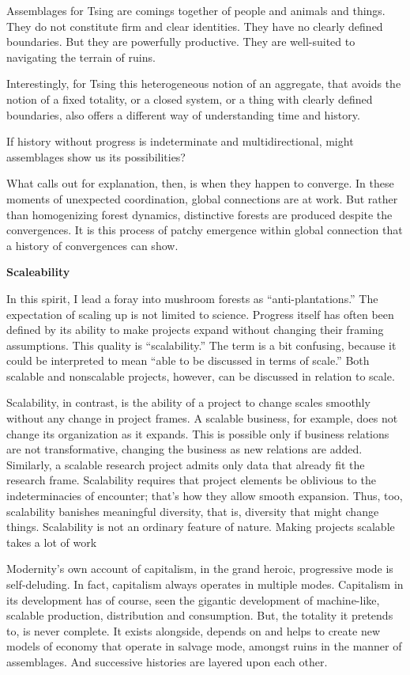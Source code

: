 \documentclass[
]{book}
\begin{document}
Assemblages for Tsing are comings together of people and animals and things. They do not constitute firm and clear identities. They have no clearly defined boundaries. But they are powerfully productive. They are well-suited to navigating the terrain of ruins.

Interestingly, for Tsing this heterogeneous notion of an aggregate, that avoids the notion of a fixed totality, or a closed system, or a thing with clearly defined boundaries, also offers a different way of understanding time and history.

If history without progress is indeterminate and multidirectional, might assemblages show us its possibilities?

What calls out for explanation, then, is when they happen to converge. In these moments of unexpected coordination, global connections are at work. But rather than homogenizing forest dynamics, distinctive forests are produced despite the convergences. It is this process of patchy emergence within global connection that a history of convergences can show.

\textbf{Scaleability}

In this spirit, I lead a foray into mushroom forests as ``anti-plantations.'' The expectation of scaling up is not limited to science. Progress itself has often been defined by its ability to make projects expand without changing their framing assumptions. This quality is ``scalability.'' The term is a bit confusing, because it could be interpreted to mean ``able to be discussed in terms of scale.'' Both scalable and nonscalable projects, however, can be discussed in relation to scale.

Scalability, in contrast, is the ability of a project to change scales smoothly without any change in project frames. A scalable business, for example, does not change its organization as it expands. This is possible only if business relations are not transformative, changing the business as new relations are added. Similarly, a scalable research project admits only data that already fit the research frame. Scalability requires that project elements be oblivious to the indeterminacies of encounter; that's how they allow smooth expansion. Thus, too, scalability banishes meaningful diversity, that is, diversity that might change things. Scalability is not an ordinary feature of nature. Making projects scalable takes a lot of work

Modernity's own account of capitalism, in the grand heroic, progressive mode is self-deluding. In fact, capitalism always operates in multiple modes. Capitalism in its development has of course, seen the gigantic development of machine-like, scalable production, distribution and consumption. But, the totality it pretends to, is never complete. It exists alongside, depends on and helps to create new models of economy that operate in salvage mode, amongst ruins in the manner of assemblages. And successive histories are layered upon each other.
\end{document}
